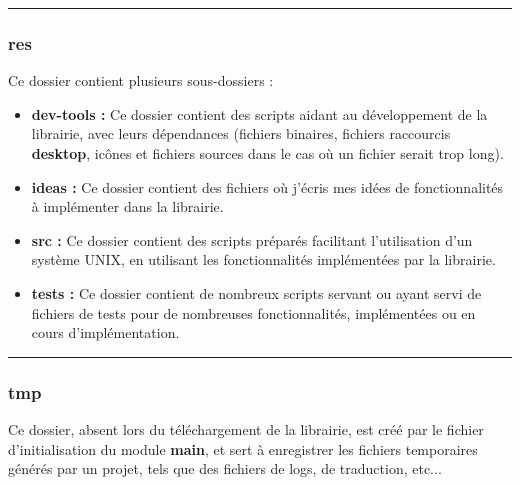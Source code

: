 \documentclass[a4paper,10pt]{article}
\begin{document}

\color{blue}\par\noindent\rule{\textwidth}{0.4pt}\color{white}

\color{blue}
\subsubsection{res}\color{white}

\begin{justify}
    Ce dossier contient plusieurs sous-dossiers :

    \begin{itemize}
        \item \textbf{\color{lime}dev-tools\color{white} :} Ce dossier contient des scripts aidant au développement de la librairie, avec leurs dépendances (fichiers binaires, fichiers raccourcis \textbf{desktop}, icônes et fichiers sources dans le cas où un fichier serait trop long).\\

        \item \textbf{\color{lime}ideas\color{white} :} Ce dossier contient des fichiers où j'écris mes idées de fonctionnalités à implémenter dans la librairie.\\

        \item \textbf{\color{lime}src\color{white} :} Ce dossier contient des scripts préparés facilitant l'utilisation d'un système UNIX, en utilisant les fonctionnalités implémentées par la librairie.\\

        \item \textbf{\color{lime}tests\color{white} :} Ce dossier contient de nombreux scripts servant ou ayant servi de fichiers de tests pour de nombreuses fonctionnalités, implémentées ou en cours d'implémentation.
    \end{itemize}
\end{justify}


\color{blue}\par\noindent\rule{\textwidth}{0.4pt}\color{white}

\color{blue}
\subsubsection{tmp}\color{white}

\begin{justify}
    Ce dossier, absent lors du téléchargement de la librairie, est créé par le fichier d'initialisation du module \textbf{main}, et sert à enregistrer les fichiers temporaires générés par un projet, tels que des fichiers de logs, de traduction, etc...
\end{justify}
\end{document}
